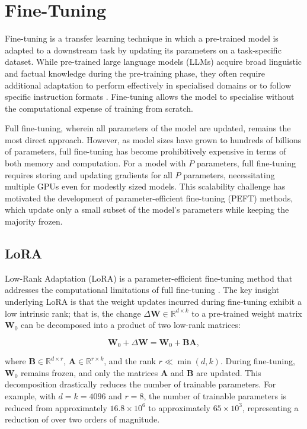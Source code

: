 \section{Fine-Tuning}

Fine-tuning is a transfer learning technique in which a pre-trained model is adapted to a downstream task by updating its parameters on a task-specific dataset. While pre-trained large language models (LLMs) acquire broad linguistic and factual knowledge during the pre-training phase, they often require additional adaptation to perform effectively in specialised domains or to follow specific instruction formats \cite{radford2018improving}. Fine-tuning allows the model to specialise without the computational expense of training from scratch.

Full fine-tuning, wherein all parameters of the model are updated, remains the most direct approach. However, as model sizes have grown to hundreds of billions of parameters, full fine-tuning has become prohibitively expensive in terms of both memory and computation. For a model with \(P\) parameters, full fine-tuning requires storing and updating gradients for all \(P\) parameters, necessitating multiple GPUs even for modestly sized models. This scalability challenge has motivated the development of parameter-efficient fine-tuning (PEFT) methods, which update only a small subset of the model's parameters while keeping the majority frozen.

\subsection{LoRA}

Low-Rank Adaptation (LoRA) is a parameter-efficient fine-tuning method that addresses the computational limitations of full fine-tuning \cite{hu2022lora}. The key insight underlying LoRA is that the weight updates incurred during fine-tuning exhibit a low intrinsic rank; that is, the change \(\Delta \mathbf{W} \in \mathbb{R}^{d \times k}\) to a pre-trained weight matrix \(\mathbf{W}_0\) can be decomposed into a product of two low-rank matrices:

\[
    \mathbf{W}_0 + \Delta \mathbf{W} = \mathbf{W}_0 + \mathbf{B}\mathbf{A},
\]

where \(\mathbf{B} \in \mathbb{R}^{d \times r}\), \(\mathbf{A} \in \mathbb{R}^{r \times k}\), and the rank \(r \ll \min(d, k)\). During fine-tuning, \(\mathbf{W}_0\) remains frozen, and only the matrices \(\mathbf{A}\) and \(\mathbf{B}\) are updated. This decomposition drastically reduces the number of trainable parameters. For example, with \(d = k = 4096\) and \(r = 8\), the number of trainable parameters is reduced from approximately \(16.8 \times 10^6\) to approximately \(65 \times 10^3\), representing a reduction of over two orders of magnitude.

